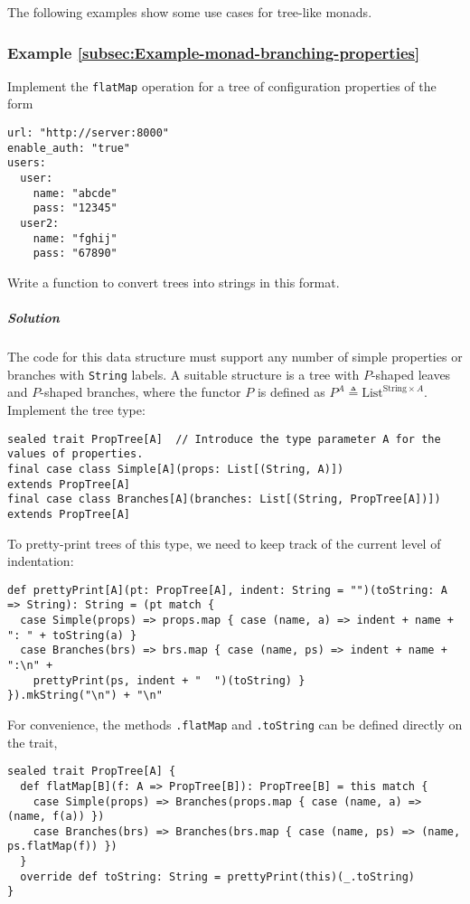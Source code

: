 The following examples show some use cases for tree-like monads.

\subsubsection{Example \label{subsec:Example-monad-branching-properties}\ref{subsec:Example-monad-branching-properties}}

Implement the \lstinline!flatMap! operation for a tree of configuration
properties of the form
\begin{lstlisting}
url: "http://server:8000"
enable_auth: "true"
users:
  user:
    name: "abcde"
    pass: "12345"
  user2:
    name: "fghij"
    pass: "67890"
\end{lstlisting}
Write a function to convert trees into strings in this format.

\subparagraph{Solution}

The code for this data structure must support any number of simple
properties or branches with \lstinline!String! labels. A suitable
structure is a tree with $P$-shaped leaves and $P$-shaped branches,
where the functor $P$ is defined as $P^{A}\triangleq\text{List}^{\text{String}\times A}$.
Implement the tree type:
\begin{lstlisting}
sealed trait PropTree[A]  // Introduce the type parameter A for the values of properties.
final case class Simple[A](props: List[(String, A)])                  extends PropTree[A]
final case class Branches[A](branches: List[(String, PropTree[A])])   extends PropTree[A]
\end{lstlisting}
To pretty-print trees of this type, we need to keep track of the current
level of indentation:
\begin{lstlisting}
def prettyPrint[A](pt: PropTree[A], indent: String = "")(toString: A => String): String = (pt match {
  case Simple(props) => props.map { case (name, a) => indent + name + ": " + toString(a) }
  case Branches(brs) => brs.map { case (name, ps) => indent + name + ":\n" +
    prettyPrint(ps, indent + "  ")(toString) }
}).mkString("\n") + "\n"
\end{lstlisting}
For convenience, the methods \lstinline!.flatMap! and \lstinline!.toString!
can be defined directly on the trait,
\begin{lstlisting}
sealed trait PropTree[A] {
  def flatMap[B](f: A => PropTree[B]): PropTree[B] = this match {
    case Simple(props) => Branches(props.map { case (name, a) => (name, f(a)) })
    case Branches(brs) => Branches(brs.map { case (name, ps) => (name, ps.flatMap(f)) })
  }
  override def toString: String = prettyPrint(this)(_.toString)
}
\end{lstlisting}

